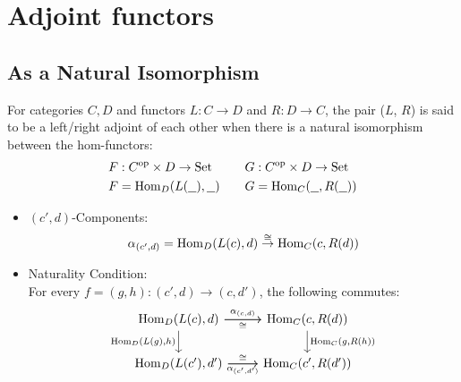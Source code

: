 \section{Adjoint functors}

\subsection{As a Natural Isomorphism}

\begin{definition}
  For categories $C, D$ and functors $L: C\to D$ and $R: D\to C$, the pair ($L$,
  $R$) is said to be a left/right adjoint of each other when there is a natural
  isomorphism between the hom-functors:
  \parencite{leinster:basic_category_theory}
  \[
    \begin{aligned}
      F&: C^{\mathrm{op}} \times D \to \mathrm{Set}\\
      F&=\mathrm{Hom}_D(L(\underline{\ \ }), \underline{\ \ })
    \end{aligned}
    \qquad
    \begin{aligned}
      G&: C^{\mathrm{op}} \times D \to \mathrm{Set}\\
      G&=\mathrm{Hom}_C(\underline{\ \ }, R(\underline{\ \ }))
    \end{aligned}
  \]

  \begin{itemize}
    \item $(c', d)$-Components:
      \[
        \alpha_{(c', d)}
          = \mathrm{Hom}_D(L(c), d) \overset{\cong}{\to} \mathrm{Hom}_C(c, R(d))\\
      \]
    \item Naturality Condition:\\
      For every $f = (g, h): (c', d) \to (c, d')$, the following commutes:
      \[\begin{tikzcd}[ampersand replacement=\&]
        {\Hom_D(L(c), d)} \& {\Hom_C(c, R(d))} \\
        {\Hom_D(L(c'),d')} \& {\Hom_C(c',R(d'))}
        \arrow["{\Hom_D(L(g), h)}"', from=1-1, to=2-1]
        \arrow["{\Hom_C(g, R(h))}", from=1-2, to=2-2]
        \arrow["{\alpha_{(c, d)}}", from=1-1, to=1-2]
        \arrow["{\alpha_{(c',d')}}"', from=2-1, to=2-2]
        \arrow["\cong"', from=1-1, to=1-2]
        \arrow["\cong", from=2-1, to=2-2]
      \end{tikzcd}\]
  \end{itemize}
\end{definition}

